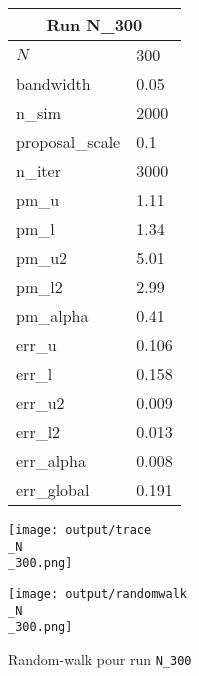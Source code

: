 
\begin{figure}[H]
  \centering
  \begin{minipage}[t]{0.45\textwidth}
    \vspace{0pt}
    \footnotesize
    \begin{tabular}{|l|l|}\hline
    \multicolumn{2}{|c|}{\textbf{Run N\_300}} \\ \hline
    $N$ & 300 \\ \hline
    bandwidth & 0.05 \\ \hline
    n\_sim & 2000 \\ \hline
    proposal\_scale & 0.1 \\ \hline
    n\_iter & 3000 \\ \hline
    pm\_u & 1.11 \\ \hline
    pm\_l & 1.34 \\ \hline
    pm\_u2 & 5.01 \\ \hline
    pm\_l2 & 2.99 \\ \hline
    pm\_alpha & 0.41 \\ \hline
    err\_u & 0.106 \\ \hline
    err\_l & 0.158 \\ \hline
    err\_u2 & 0.009 \\ \hline
    err\_l2 & 0.013 \\ \hline
    err\_alpha & 0.008 \\ \hline
    err\_global & 0.191 \\ \hline
    \end{tabular}
  \end{minipage}
  \hfill
  \begin{minipage}[t]{0.45\textwidth}
    \vspace{0pt}
    \texttt{[image: output/trace\\\_N\\\_300.png]}
  \end{minipage}
\end{figure}

\begin{figure}[H]
  \centering
  \texttt{[image: output/randomwalk\\\_N\\\_300.png]}
  \caption{Random-walk pour run \texttt{N\_300}}
\end{figure}

